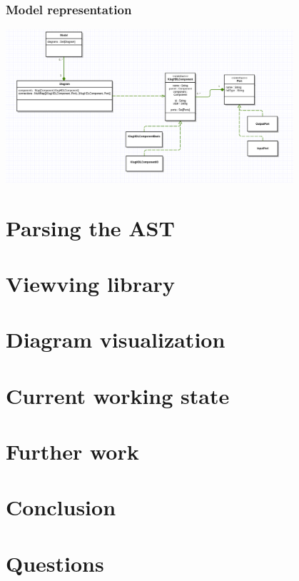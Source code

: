 \documentclass[11pt, handout]{beamer}
\begin{document}
\begin{frame}
  \frametitle{Model representation}
  \begin{center}
    \includegraphics[width=0.8\textwidth]{class-diagram-intermeditate-model}
  \end{center}
\end{frame}

\section{Parsing the AST}

\section{Viewving library}

\section{Diagram visualization}

\section{Current working state}

\section{Further work}

\section{Conclusion}

\section{Questions}
\end{document}
